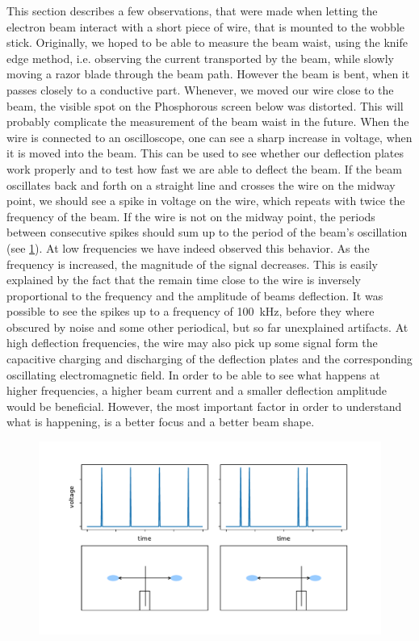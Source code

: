This section describes a few observations, that were made when letting the electron beam interact with a short piece of wire, that is mounted to the wobble stick. Originally, we hoped to be able to measure the beam waist, using the knife edge method, i.e. observing the current transported by the beam, while slowly moving a razor blade through the beam path. However the beam is bent, when it passes closely to a conductive part. Whenever, we moved our wire close to the beam, the visible spot on the Phosphorous screen below was distorted. This will probably complicate the measurement of the beam waist in the future. 
When the wire is connected to an oscilloscope, one can see a sharp increase in voltage, when it is moved into the beam. This can be used to see whether our deflection plates work properly and to test how fast we are able to deflect the beam. If the beam oscillates back and forth on a straight line and crosses the wire on the midway point, we should see a spike in voltage on the wire, which repeats with twice the frequency of the beam. If the wire is not on the midway point, the periods between consecutive spikes should sum up to the period of the beam's oscillation (see \cref{fig:spikes}). At low frequencies we have indeed observed this behavior. As the frequency is increased, the magnitude of the signal decreases. This is easily explained by the fact that the remain time close to the wire is inversely proportional to the frequency and the amplitude of beams deflection. It was possible to see the spikes up to a frequency of \SI{100}{\kilo\hertz}, before they where obscured by noise and some other periodical, but so far unexplained artifacts.
At high deflection frequencies, the wire may also pick up some signal form the capacitive charging and discharging of the deflection plates and the corresponding oscillating electromagnetic field.
In order to be able to see what happens at higher frequencies, a higher beam current and a smaller deflection amplitude would be beneficial. However, the most important factor in order to understand what is happening, is a better focus and a better beam shape.

\begin{figure}
	\centering
	\includegraphics[width=0.8\linewidth]{Chapters/beam-characterization/Spikes}
	\caption{}
	\label{fig:spikes}
\end{figure}
